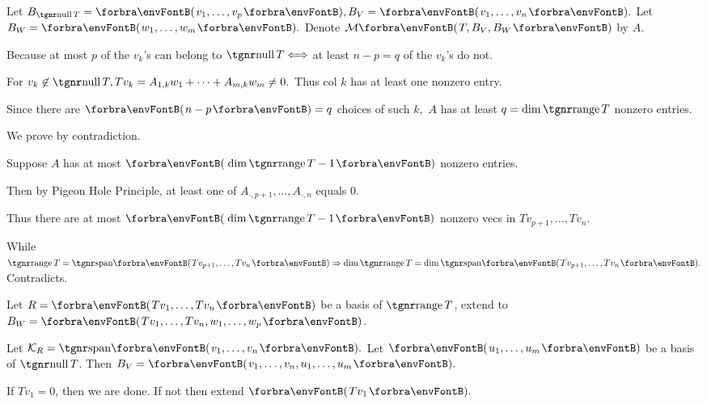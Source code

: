 \documentclass[a4paper, 11pt, UTF8]{article}
\begin{document}
\begin{large}
\par\quad
Let $B_{\null T}=\Par{v_1,\dots,v_p},B_{V}=\Par{v_1,\dots,v_n}.$ Let $B_W=\Par{w_1,\dots,w_m}.$ Denote $\Mt{T,B_V,B_W}$ by $A.$\vspace{4pt}\par\quad
Because at most $p$ of the $v_k$'s can belong to $\null T\Longleftrightarrow$ at least $n-p=q$ of the $v_k$'s do not.\par\quad
For $v_k\not\in\null T,Tv_k=A_{1,k}w_1+\dots+A_{m,k}w_m\neq 0.$ Thus col $k$ has at least one nonzero entry.\par\quad
Since there are $\Par{n-p}=q$ choices of such $k,$ $A$ has at least $q=\dim\range T$ nonzero entries.\PfEnd\vspace{8pt}\par\quad
\Or We prove by contradiction.\par\quad
Suppose $A$ has at most $\Par{\dim\range T-1}$ nonzero entries.\par\quad
Then by Pigeon Hole Principle, at least one of $A_{\cdot,p+1},\dots,A_{\cdot,n}$ equals $0$.\par\quad
Thus there are at most $\Par{\dim\range T-1}$ nonzero vecs in $Tv_{p+1},\dots,Tv_n$.\par\quad
While $\range T=\Span{Tv_{p+1},\dots,Tv_n}\Rightarrow\dim\range T=\dim\Span{Tv_{p+1},\dots,Tv_n}.$ Contradicts.\PfEnd
\SepLine
\pagebreak

\par\quad
Let $R=\Par{Tv_1,\dots,Tv_n}$ be a basis of $\range T$, extend to  $B_W=\Par{Tv_1,\dots,Tv_n,w_1,\dots,w_p}$.\par\quad
Let $\mathcal{K}_R=\Span{v_1,\dots,v_n}.$ Let $\Par{u_1,\dots,u_m}$ be a basis of $\null T$. Then $B_V=\Par{v_1,\dots,v_n,u_1,\dots,u_m}.$\PfEnd
\SepLine

If $Tv_1=0$, then we are done. If not then extend $\Par{Tv_1}.$\PfEnd
\SepLine


\end{large}
\end{document}
